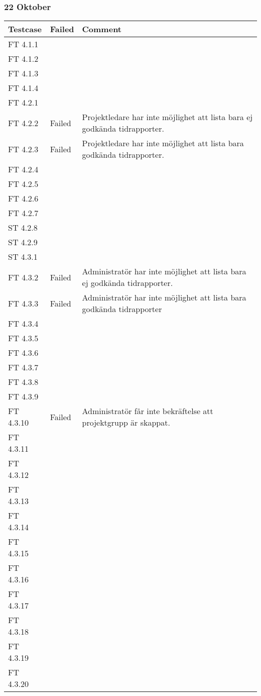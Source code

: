 \documentclass[a4paper]{article}
\begin{document}
\subsubsection{22 Oktober}
\begin{tabular}{| l | l | p{11cm} |}
\hline
Testcase &  Failed & Comment\\
\hline
FT 4.1.1 & & \\
\hline
FT 4.1.2 & & \\
\hline
FT 4.1.3 & & \\
\hline
FT 4.1.4 & & \\
\hline
FT 4.2.1 & & \\
\hline
FT 4.2.2 & Failed & Projektledare har inte möjlighet att lista bara ej godkända tidrapporter.\\
\hline
FT 4.2.3 & Failed & Projektledare har inte möjlighet att lista bara godkända tidrapporter.\\
\hline
FT 4.2.4 & & \\
\hline
FT 4.2.5 & & \\
\hline
FT 4.2.6 & & \\
\hline
FT 4.2.7 & & \\
\hline
ST 4.2.8 & & \\
\hline
ST 4.2.9 & & \\
\hline
ST 4.3.1 & & \\
\hline
FT 4.3.2 & Failed & Administratör har inte möjlighet att lista bara ej godkända tidrapporter. \\
\hline
FT 4.3.3 & Failed & Administratör har inte möjlighet att lista bara godkända tidrapporter\\
\hline
FT 4.3.4 & & \\
\hline
FT 4.3.5 & & \\
\hline
FT 4.3.6 & & \\
\hline
FT 4.3.7 & & \\
\hline
FT 4.3.8 & & \\
\hline
FT 4.3.9 & & \\
\hline
FT 4.3.10 & Failed & Administratör får inte bekräftelse att projektgrupp är skappat. \\
\hline
FT 4.3.11 & & \\
\hline
FT 4.3.12 & & \\
\hline
FT 4.3.13 & & \\
\hline
FT 4.3.14 & & \\
\hline
FT 4.3.15 & & \\
\hline
FT 4.3.16 & & \\
\hline
FT 4.3.17 & & \\
\hline
FT 4.3.18 & & \\
\hline
FT 4.3.19 & & \\
\hline
FT 4.3.20 & & \\
\end{tabular}
\end{document}
